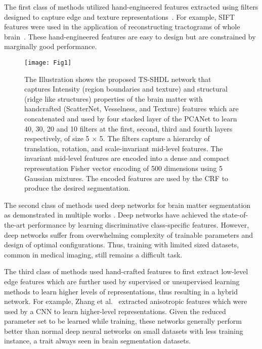 \documentclass[10pt,twocolumn,letterpaper]{article}
\begin{document}
The first class of methods utilized hand-engineered features extracted using filters designed to capture edge and texture representations~\cite{kapur1996segmentation,angoth2013novel,dwith2013wavelet,amar1}. For example, SIFT~\cite{lowe} features were used in the application of reconstructing tractograms of whole brain~\cite{smith2013sift}. These hand-engineered features are easy to design but are constrained by marginally good performance. 

\begin{figure*}[t!]
	\centering
	\texttt{[image: Fig1]}
	\caption{The Illustration shows the proposed TS-SHDL network that captures Intensity (region boundaries and texture) and structural (ridge like structures) properties of the brain matter with handcrafted (ScatterNet, Vesselness, and Texture) features which are concatenated and used by four stacked layer of the PCANet to learn 40, 30, 20 and 10 filters at the first, second, third and fourth layers respectively, of size 5 $\times$ 5. The filters capture a hierarchy of translation, rotation, and scale-invariant mid-level features. The invariant mid-level features are encoded into a dense and compact representation Fisher vector encoding of 500 dimensions using 5 Gaussian mixtures. The encoded features are used by the CRF to produce the desired segmentation.}
	\label{fig:properties}
\end{figure*}

The second class of methods used deep networks for brain matter segmentation as demonstrated in multiple works \cite{bezdek1993review,havaei2017brain}. Deep networks have achieved the state-of-the-art performance by learning discriminative class-specific features. However, deep networks suffer from overwhelming complexity of trainable parameters and design of optimal configurations. Thus, training with limited sized datasets, common in medical imaging, still remains a difficult task. 

The third class of methods used hand-crafted features to first extract low-level edge features which are further used by supervised or unsupervised learning methods to learn higher levels of representations, thus resulting in a hybrid network. For example, Zhang et al.~\cite{zhang2015deep} extracted anisotropic features which were used by a CNN to learn higher-level representations. Given the reduced parameter set to be learned while training, these networks generally perform better than normal deep neural networks on small datasets with less training instance, a trait always seen in brain segmentation datasets. 
\end{document}
